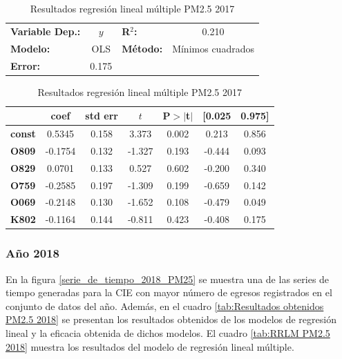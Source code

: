 \begin{table}[hbt!]
\caption{Resultados regresión lineal múltiple PM2.5 2017}
\label{tab:RRLM PM2.5 2017}
\begin{center}
\begin{tabular}{lclc}
\toprule
\textbf{Variable Dep.:}    &        $y$         & \textbf{  R$^2$:         } &     0.210   \\
\textbf{Modelo:}            &       OLS        & \textbf{Método:}           &  Mínimos cuadrados   \\
\textbf{Error:}            & 0.175  \\
\bottomrule
\end{tabular}
\begin{tabular}{lcccccc}
               & \textbf{coef} & \textbf{std err} & \textbf{$t$} & \textbf{P$> |$t$|$} & \textbf{[0.025} & \textbf{0.975]}  \\
\midrule
\textbf{const} &       0.5345  &        0.158     &     3.373  &         0.002        &        0.213    &        0.856     \\
\textbf{O809}  &      -0.1754  &        0.132     &    -1.327  &         0.193        &       -0.444    &        0.093     \\
\textbf{O829}  &       0.0701  &        0.133     &     0.527  &         0.602        &       -0.200    &        0.340     \\
\textbf{O759}  &      -0.2585  &        0.197     &    -1.309  &         0.199        &       -0.659    &        0.142     \\
\textbf{O069}  &      -0.2148  &        0.130     &    -1.652  &         0.108        &       -0.479    &        0.049     \\
\textbf{K802}  &      -0.1164  &        0.144     &    -0.811  &         0.423        &       -0.408    &        0.175     \\
\bottomrule
\end{tabular}
\end{center}
\end{table}

\clearpage
\subsubsection{Año 2018}
En la figura \ref{serie_de_tiempo_2018_PM25} se muestra una de las series de tiempo generadas para la CIE con mayor número de egresos registrados en el conjunto de datos del año. Además, en el cuadro \ref{tab:Resultados obtenidos PM2.5 2018} se presentan los resultados obtenidos de los modelos de regresión lineal y la eficacia obtenida de dichos modelos. El cuadro \ref{tab:RRLM PM2.5 2018} muestra los resultados del modelo de regresión lineal múltiple.

